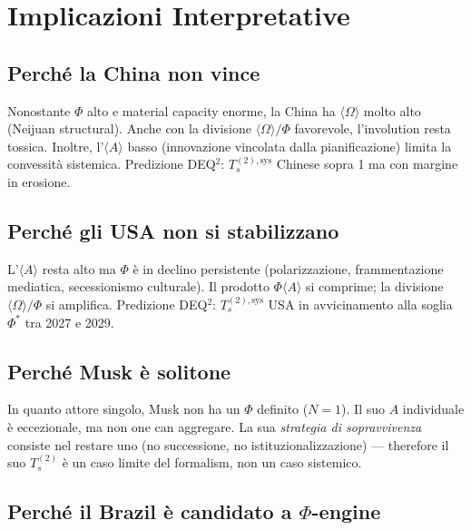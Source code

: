 \section{Implicazioni Interpretative}\label{implicazioni-interpretative}

\subsection{Perché la China non vince}\label{perchuxe9-la-cina-non-vince}

Nonostante \(\Phi\) alto e material capacity enorme, la China ha
\(\langle\Omega\rangle\) molto alto (Neijuan structural). Anche con la
divisione \(\langle\Omega\rangle/\Phi\) favorevole, l'involution resta
tossica. Inoltre, l'\(\langle A\rangle\) basso (innovazione vincolata
dalla pianificazione) limita la convessità sistemica. Predizione DEQ$^2$:
\(T_s^{(2),\text{sys}}\) Chinese sopra 1 ma con margine in erosione.

\subsection{Perché gli USA non si
stabilizzano}\label{perchuxe9-gli-usa-non-si-stabilizzano}

L'\(\langle A\rangle\) resta alto ma \(\Phi\) è in declino persistente
(polarizzazione, frammentazione mediatica, secessionismo culturale). Il
prodotto \(\Phi\langle A\rangle\) si comprime; la divisione
\(\langle\Omega\rangle/\Phi\) si amplifica. Predizione DEQ$^2$:
\(T_s^{(2),\text{sys}}\) USA in avvicinamento alla soglia \(\Phi^*\) tra
2027 e 2029.

\subsection{Perché Musk è solitone}\label{perchuxe9-musk-uxe8-solitone}

In quanto attore singolo, Musk non ha un \(\Phi\) definito (\(N=1\)). Il
suo \(A\) individuale è eccezionale, ma non one can aggregare. La sua
\emph{strategia di sopravvivenza} consiste nel restare uno (no
successione, no istituzionalizzazione) --- therefore il suo \(T_s^{(2)}\) è
un caso limite del formalism, non un caso sistemico.

\subsection{Perché il Brazil è candidato a
$\Phi$-engine}\label{perchuxe9-il-brasile-uxe8-candidato-a-ux3c6-engine}

